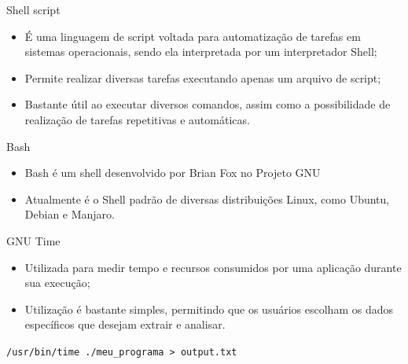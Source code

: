 \begin{frame}{Shell script}
    \begin{itemize}
        \item É uma linguagem de script voltada para automatização de tarefas em sistemas operacionais, sendo ela interpretada por um interpretador Shell;
        \item Permite realizar diversas tarefas executando apenas um arquivo de script;
        \item Bastante útil ao executar diversos comandos, assim como a possibilidade de realização de tarefas repetitivas e automáticas.
    \end{itemize}
\end{frame}

\begin{frame}{Bash}
    \begin{itemize}
        \item Bash é um shell desenvolvido por Brian Fox no Projeto GNU
        \item Atualmente é o Shell padrão de diversas distribuições Linux, como Ubuntu, Debian e Manjaro.
    \end{itemize}
\end{frame}

\begin{frame}{GNU Time}
    \begin{itemize}
        \item Utilizada para medir tempo e recursos consumidos por uma aplicação durante sua execução;
        \item Utilização é bastante simples, permitindo que os usuários escolham os dados específicos que desejam extrair e analisar.
    \end{itemize}
    
    \begin{center}
        \texttt{/usr/bin/time ./meu\_programa > output.txt}
    \end{center}
\end{frame}


